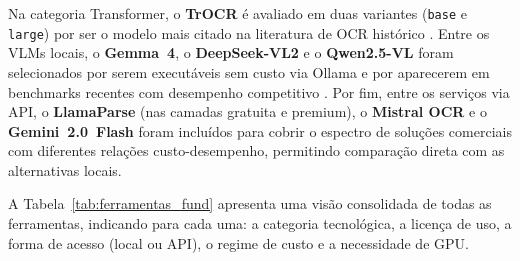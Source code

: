 \documentclass[
  12pt,
  oneside,
  a4paper,
  chapter=TITLE,
  section=TITLE,
  english,
  brazil
]{abntex2}
\begin{document}
Na categoria Transformer, o \textbf{TrOCR} é avaliado em duas variantes
(\texttt{base} e \texttt{large}) por ser o modelo mais citado na literatura de OCR
histórico \cite{huang2021}. Entre os VLMs locais, o \textbf{Gemma~4}, o
\textbf{DeepSeek-VL2} e o \textbf{Qwen2.5-VL} foram selecionados por serem executáveis
sem custo via Ollama e por aparecerem em benchmarks recentes com desempenho competitivo
\cite{vesalainen2025}. Por fim, entre os serviços via API, o \textbf{LlamaParse} (nas
camadas gratuita e premium), o \textbf{Mistral OCR} e o \textbf{Gemini~2.0~Flash} foram
incluídos para cobrir o espectro de soluções comerciais com diferentes relações
custo-desempenho, permitindo comparação direta com as alternativas locais.

A Tabela~\ref{tab:ferramentas_fund} apresenta uma visão consolidada de todas as
ferramentas, indicando para cada uma: a categoria tecnológica, a licença de uso, a forma
de acesso (local ou API), o regime de custo e a necessidade de GPU.
\end{document}
